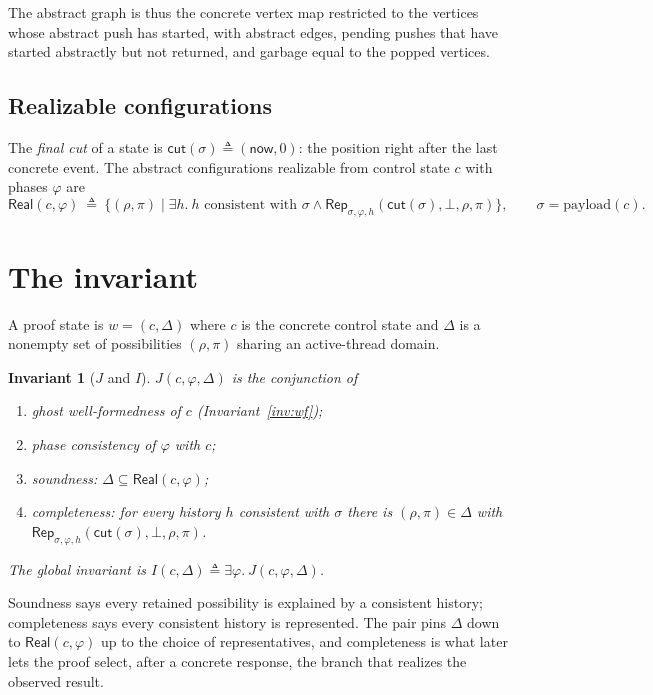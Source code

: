 \documentclass[11pt]{article}
\newtheorem{invariant}[lemma]{Invariant}
\theoremstyle{definition}
\theoremstyle{remark}
\newcommand{\poss}{\Delta}
\newcommand{\conc}{\sigma}
\newcommand{\abst}{\rho}
\newcommand{\tokens}{\pi}
\newcommand{\now}{\mathsf{now}}
\newcommand{\Real}{\mathsf{Real}}
\newcommand{\Rep}{\mathsf{Rep}}
\newcommand{\cut}{\mathsf{cut}}
\begin{document}
The abstract graph is thus the concrete vertex map restricted to the vertices
whose abstract push has started, with abstract edges, pending pushes that
have started abstractly but not returned, and garbage equal to the popped
vertices.

\subsection{Realizable configurations}

The \emph{final cut} of a state is \(\cut(\conc)\triangleq(\now,0)\): the
position right after the last concrete event.  The abstract configurations
realizable from control state \(c\) with phases \(\varphi\) are
\[
  \Real(c,\varphi)\ \triangleq\
  \{(\abst,\tokens)\mid \exists h.\ h\text{ consistent with }\conc\land
     \Rep_{\conc,\varphi,h}(\cut(\conc),\bot,\abst,\tokens)\},
  \qquad \conc=\mathrm{payload}(c).
\]

\section{The invariant}

A proof state is \(w=(c,\poss)\) where \(c\) is the concrete control state
and \(\poss\) is a nonempty set of possibilities \((\abst,\tokens)\) sharing
an active-thread domain.

\begin{invariant}[\(J\) and \(I\)]
\(J(c,\varphi,\poss)\) is the conjunction of
\begin{enumerate}[nosep]
\item ghost well-formedness of \(c\) (Invariant~\ref{inv:wf});
\item phase consistency of \(\varphi\) with \(c\);
\item soundness: \(\poss\subseteq\Real(c,\varphi)\);
\item completeness: for every history \(h\) consistent with \(\conc\) there
  is \((\abst,\tokens)\in\poss\) with
  \(\Rep_{\conc,\varphi,h}(\cut(\conc),\bot,\abst,\tokens)\).
\end{enumerate}
The global invariant is \(I(c,\poss)\triangleq\exists\varphi.\ J(c,\varphi,\poss)\).
\end{invariant}

Soundness says every retained possibility is explained by a consistent
history; completeness says every consistent history is represented.  The
pair pins \(\poss\) down to \(\Real(c,\varphi)\) up to the choice of
representatives, and completeness is what later lets the proof select, after
a concrete response, the branch that realizes the observed result.
\end{document}
